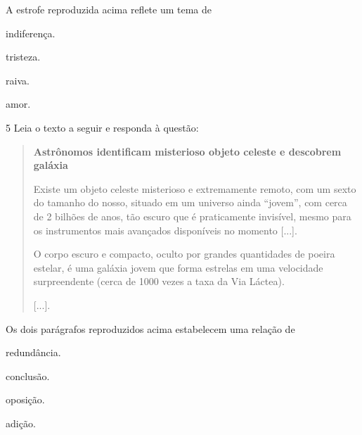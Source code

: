 A estrofe reproduzida acima reflete um tema de

\begin{escolha}
\item indiferença.

\item tristeza.

\item raiva.

\item amor.
\end{escolha}


\num{5} Leia o texto a seguir e responda à questão:

\begin{quote}
\textbf{Astrônomos identificam misterioso objeto celeste e descobrem
galáxia}

Existe um objeto celeste misterioso e extremamente remoto, com um
sexto do tamanho do nosso, situado em um universo ainda ``jovem'', com
cerca de 2 bilhões de anos, tão escuro que é praticamente invisível,
mesmo para os instrumentos mais avançados disponíveis no momento
{[}...{]}.

O corpo escuro e compacto, oculto por grandes quantidades de poeira
estelar, é uma galáxia jovem que forma estrelas em uma velocidade
surpreendente (cerca de 1000 vezes a taxa da Via Láctea).

{[}...{]}.
\end{quote}

Os dois parágrafos reproduzidos acima estabelecem uma relação de

\begin{escolha}
\item redundância.

\item conclusão.

\item oposição.

\item adição.
\end{escolha}

